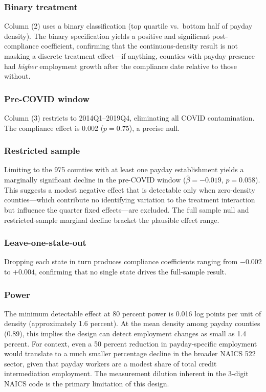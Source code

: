 \documentclass[12pt]{article}
\begin{document}
\subsubsection*{Binary treatment} Column (2) uses a binary classification (top quartile vs.\ bottom half of payday density). The binary specification yields a positive and significant post-compliance coefficient, confirming that the continuous-density result is not masking a discrete treatment effect---if anything, counties with payday presence had \textit{higher} employment growth after the compliance date relative to those without.

\subsubsection*{Pre-COVID window} Column (3) restricts to 2014Q1--2019Q4, eliminating all COVID contamination. The compliance effect is 0.002 ($p = 0.75$), a precise null.

\subsubsection*{Restricted sample} Limiting to the 975 counties with at least one payday establishment yields a marginally significant decline in the pre-COVID window ($\hat{\beta} = -0.019$, $p = 0.058$). This suggests a modest negative effect that is detectable only when zero-density counties---which contribute no identifying variation to the treatment interaction but influence the quarter fixed effects---are excluded. The full sample null and restricted-sample marginal decline bracket the plausible effect range.

\subsubsection*{Leave-one-state-out} Dropping each state in turn produces compliance coefficients ranging from $-0.002$ to $+0.004$, confirming that no single state drives the full-sample result.

\subsubsection*{Power} The minimum detectable effect at 80 percent power is 0.016 log points per unit of density (approximately 1.6 percent). At the mean density among payday counties (0.89), this implies the design can detect employment changes as small as 1.4 percent. For context, even a 50 percent reduction in payday-specific employment would translate to a much smaller percentage decline in the broader NAICS 522 sector, given that payday workers are a modest share of total credit intermediation employment. The measurement dilution inherent in the 3-digit NAICS code is the primary limitation of this design.
\end{document}
